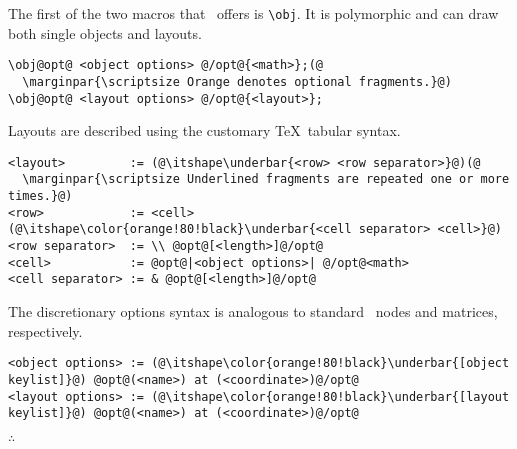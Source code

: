 The first of the two macros that \koDi\ offers is \lstinline|\obj|.
It is polymorphic and can draw both single objects and layouts.

\begin{lstlisting}
\obj@opt@ <object options> @/opt@{<math>};(@
  \marginpar{\scriptsize Orange denotes optional fragments.}@)
\obj@opt@ <layout options> @/opt@{<layout>};
\end{lstlisting}

Layouts are described using the customary \TeX\ tabular syntax.

\begin{lstlisting}
<layout>         := (@\itshape\underbar{<row> <row separator>}@)(@
  \marginpar{\scriptsize Underlined fragments are repeated one or more times.}@)
<row>            := <cell> (@\itshape\color{orange!80!black}\underbar{<cell separator> <cell>}@)
<row separator>  := \\ @opt@[<length>]@/opt@
<cell>           := @opt@|<object options>| @/opt@<math>
<cell separator> := & @opt@[<length>]@/opt@
\end{lstlisting}

The discretionary options syntax is analogous to standard \TikZ\ nodes and
matrices, respectively.

\begin{lstlisting}
<object options> := (@\itshape\color{orange!80!black}\underbar{[object keylist]}@) @opt@(<name>) at (<coordinate>)@/opt@
<layout options> := (@\itshape\color{orange!80!black}\underbar{[layout keylist]}@) @opt@(<name>) at (<coordinate>)@/opt@
\end{lstlisting}

\hfill$\therefore$\hfill\null




